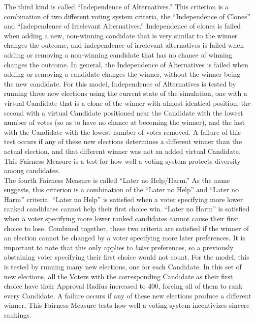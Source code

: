 \documentclass[12pt]{article}
\begin{document}
\qquad The third kind is called ``Independence of Alternatives.'' This criterion is a combination of two different voting system criteria, the ``Independence of Clones'' and ``Independence of Irrelevant Alternatives.'' Independence of clones is failed when adding a new, non-winning candidate that is very similar to the winner changes the outcome, and independence of irrelevant alternatives is failed when adding or removing a non-winning candidate that has no chance of winning changes the outcome. In general, the Independence of Alternatives is failed when adding or removing a candidate changes the winner, without the winner being the new candidate. For this model, Independence of Alternatives is tested by running three new elections using the current state of the simulation, one with a virtual Candidate that is a clone of the winner with almost identical position, the second with a virtual Candidate positioned near the Candidate with the lowest number of votes (so as to have no chance at becoming the winner), and the last with the Candidate with the lowest number of votes removed. A failure of this test occurs if any of these new elections determines a different winner than the actual election, and that different winner was not an added virtual Candidate. This Fairness Measure is a test for how well a voting system protects diversity among candidates. \\

\qquad The fourth Fairness Measure is called ``Later no Help/Harm.'' As the name suggests, this criterion is a combination of the ``Later no Help'' and ``Later no Harm'' criteria. ``Later no Help'' is satisfied when a voter specifying more lower ranked candidates cannot help their first choice win. ``Later no Harm'' is satisfied when a voter specifying more lower ranked candidates cannot cause their first choice to lose. Combined together, these two criteria are satisfied if the winner of an election cannot be changed by a voter specifying more later preferences. It is important to note that this only applies to \textit{later} preferences, so a previously abstaining voter specifying their first choice would not count. For the model, this is tested by running many new elections, one for each Candidate. In this set of new elections, all the Voters with the corresponding Candidate as their first choice have their Approval Radius increased to 400, forcing all of them to rank every Candidate. A failure occurs if any of these new elections produce a different winner. This Fairness Measure tests how well a voting system incentivizes sincere rankings. \\ 
\end{document}
